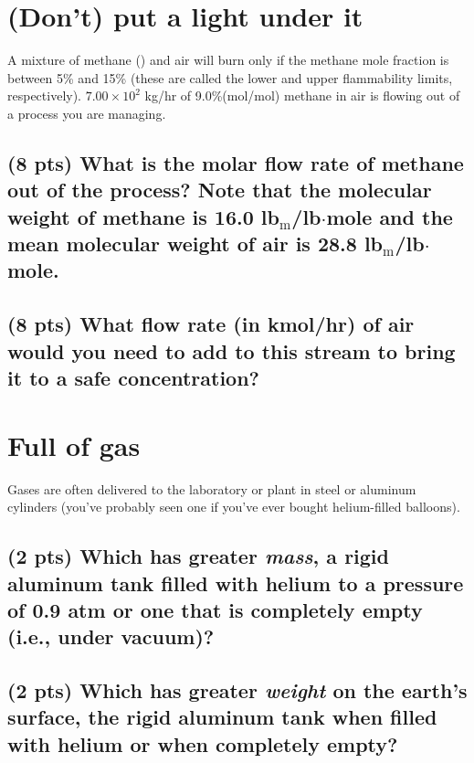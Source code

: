 \documentclass[11pt]{article}
\begin{document}
\section{(Don't) put a light under it}
\label{sec-1}
A mixture of methane () and air will burn only if the methane mole fraction is between 5\% and 15\% (these are called the lower and upper flammability limits, respectively).  \(7.00 \times 10^{2}\) kg/hr of 9.0\%(mol/mol) methane in air is flowing out of a process you are managing.

\subsection{(8 pts) What is the molar flow rate of methane out of the process?  Note that the molecular weight of methane is 16.0 lb\(_\mathrm{m}\)/lb$\cdot$mole and the mean molecular weight of air is 28.8 lb\(_\mathrm{m}\)/lb$\cdot$mole.}
\label{sec-1-1}
\newpage
\subsection{(8 pts) What flow rate (in kmol/hr) of air would you need to add to this stream to bring it to a safe concentration?}
\label{sec-1-2}
\vspace{13cm}
\section{Full of gas}
\label{sec-2}
Gases are often delivered to the laboratory or plant in steel or aluminum cylinders (you've probably seen one if you've ever bought helium-filled balloons).

\subsection{(2 pts) Which has greater \emph{mass}, a rigid aluminum tank filled with helium to a pressure of 0.9 atm or one that is completely empty (i.e., under vacuum)?}
\label{sec-2-1}
\vspace{1cm}
\subsection{(2 pts) Which has greater \emph{weight} on the earth's surface, the rigid aluminum tank when filled with helium or when completely empty?}
\label{sec-2-2}
\vspace{1cm}
\end{document}
